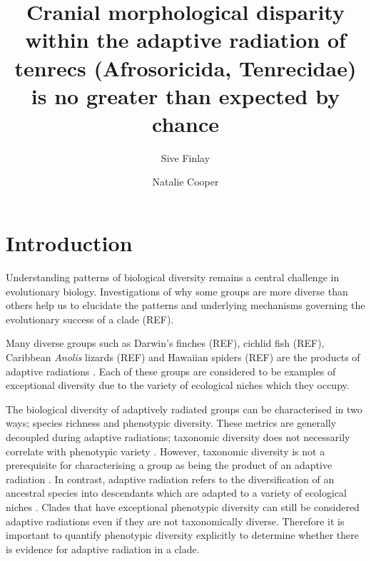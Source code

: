 \documentclass[12pt,a4paper]{article}
\begin{document}
\modulolinenumbers[1] %


\title{Cranial morphological disparity within the adaptive radiation of tenrecs (Afrosoricida, Tenrecidae) is no greater than expected by chance} 


\author[1,2,*]{Sive Finlay}
\author[1,2]{Natalie Cooper}
\date{}	%

\maketitle

\begin{abstract}
\end{abstract}

\section{Introduction}

Understanding patterns of biological diversity remains a central challenge in evolutionary biology. Investigations of why some groups are more diverse than others help us to elucidate the patterns and underlying mechanisms governing the evolutionary success of a clade (REF). 

Many diverse groups such as Darwin's finches (REF), cichlid fish (REF), Caribbean \textit{Anolis} lizards (REF) and Hawaiian spiders (REF) are the products of adaptive radiations \citep{Losos2010}. Each of these groups are considered to be examples of exceptional diversity due to the variety of ecological niches which they occupy. 

The biological diversity of adaptively radiated groups can be characterised in two ways; species richness and phenotypic diversity. These metrics are generally decoupled during adaptive radiations; taxonomic diversity does not necessarily correlate with phenotypic variety \citep{Ruta2013, Hopkins2013}. 
However, taxonomic diversity is not a prerequisite for characterising a group as being the product of an adaptive radiation \citep{Losos2010}. In contrast, adaptive radiation refers to the diversification of an ancestral species into descendants which are adapted to a variety of ecological niches \citep{Losos2010a}. Clades that have exceptional phenotypic diversity can still be considered adaptive radiations even if they are not taxonomically diverse. Therefore it is important to quantify phenotypic diversity explicitly to determine whether there is evidence for adaptive radiation in a clade.
\end{document}
